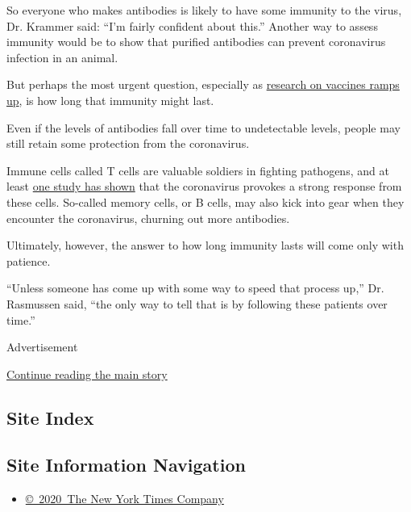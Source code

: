 So everyone who makes antibodies is likely to have some immunity to the
virus, Dr. Krammer said: ``I'm fairly confident about this.'' Another
way to assess immunity would be to show that purified antibodies can
prevent coronavirus infection in an animal.

But perhaps the most urgent question, especially as
\href{https://www.nytimes3xbfgragh.onion/2020/05/02/us/politics/vaccines-coronavirus-research.html}{research
on vaccines ramps up}, is how long that immunity might last.

Even if the levels of antibodies fall over time to undetectable levels,
people may still retain some protection from the coronavirus.

Immune cells called T cells are valuable soldiers in fighting pathogens,
and at least
\href{https://www.sciencedirect.com/science/article/pii/S1074761320301813}{one
study has shown} that the coronavirus provokes a strong response from
these cells. So-called memory cells, or B cells, may also kick into gear
when they encounter the coronavirus, churning out more antibodies.

Ultimately, however, the answer to how long immunity lasts will come
only with patience.

``Unless someone has come up with some way to speed that process up,''
Dr. Rasmussen said, ``the only way to tell that is by following these
patients over time.''

Advertisement

\protect\hyperlink{after-bottom}{Continue reading the main story}

\hypertarget{site-index}{%
\subsection{Site Index}\label{site-index}}

\hypertarget{site-information-navigation}{%
\subsection{Site Information
Navigation}\label{site-information-navigation}}

\begin{itemize}
\tightlist
\item
  \href{https://help.nytimes3xbfgragh.onion/hc/en-us/articles/115014792127-Copyright-notice}{©~2020~The
  New York Times Company}
\end{itemize}


